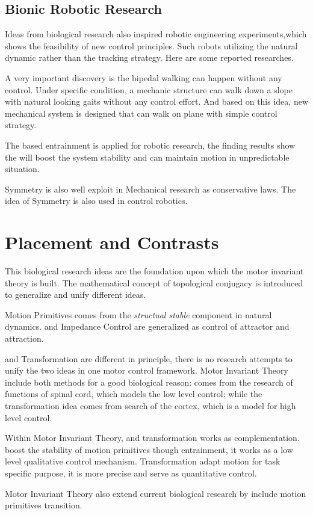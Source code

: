 \subsection{Bionic Robotic Research}
Ideas from biological research  also inspired robotic engineering experiments,which shows the feasibility of new control principles.
Such robots utilizing the natural dynamic rather than the tracking strategy.
Here are some reported researches.
\begin{itemize}
A very important discovery is the bipedal walking can happen without any control\citep{McGeer1990}.  
Under specific condition, a mechanic structure can walk down a slope with natural looking gaits without any control effort.
And based on this idea, new mechanical system is designed that can walk on plane with simple control strategy\citep{Collins2005}.

The \cpg based entrainment is applied for robotic research\citep{Williamson1999a}, the finding results show the \cpg will boost the system stability and can maintain motion in unpredictable situation.

Symmetry is also well exploit in Mechanical research as conservative laws.
The idea of Symmetry is also used in control robotics\citep{spong2005controlled}.
\end{itemize}

\section{Placement and Contrasts}
This biological research ideas are the foundation upon which the motor invariant theory is built.
The mathematical concept of topological conjugacy is introduced to generalize and unify different ideas.

Motion Primitives comes from the \emph{structual stable} component in natural dynamics.
\eph and Impedance Control are generalized as control of attractor and attraction.

\cpg and Transformation are different in principle, there is no research attempts to unify the two ideas in one motor control framework.
Motor Invariant Theory include both methods for a good biological reason: \cpg comes from the research of functions of spinal cord, which models the low level control; while the transformation idea comes from search of the cortex, which is a model for high level control.
 
Within Motor Invariant Theory,  \cpg and transformation works as complementation.
\cpg boost the stability of motion primitives though entrainment, it works as a low level qualitative control mechanism.
Transformation adapt motion for task specific purpose, it is more precise and serve as quantitative control.

Motor Invariant Theory also extend current biological research by include motion primitives transition.


 

 



